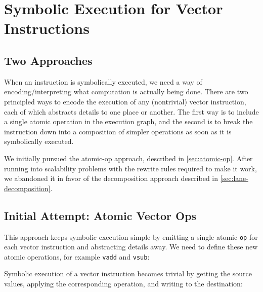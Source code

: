 \chapter{Symbolic Execution for Vector Instructions}
\label{ch:symex}


\section{Two Approaches}
\label{sec:two-approaches}

When an instruction is symbolically executed, we need a way of encoding/interpreting what computation is actually being done.
There are two principled ways to encode the execution of any (nontrivial) vector instruction, each of which abstracts details to one place or another.
The first way is to include a single atomic operation in the execution graph, and the second is to break the instruction down into a composition of simpler operations as soon as it is symbolically executed.

We initially pursued the atomic-op approach, described in \autoref{sec:atomic-op}.
After running into scalability problems with the rewrite rules required to make it work, we abandoned it in favor of the decomposition approach described in \autoref{sec:lane-decomposition}.

\section{Initial Attempt: Atomic Vector Ops}
\label{sec:atomic-op}

This approach keeps symbolic execution simple by emitting a single atomic \texttt{op} for each vector instruction and abstracting details away.
We need to define these new atomic operations, for example \texttt{vadd} and \texttt{vsub}:


Symbolic execution of a vector instruction becomes trivial by getting the source values, applying the corresponding operation, and writing to the destination:


